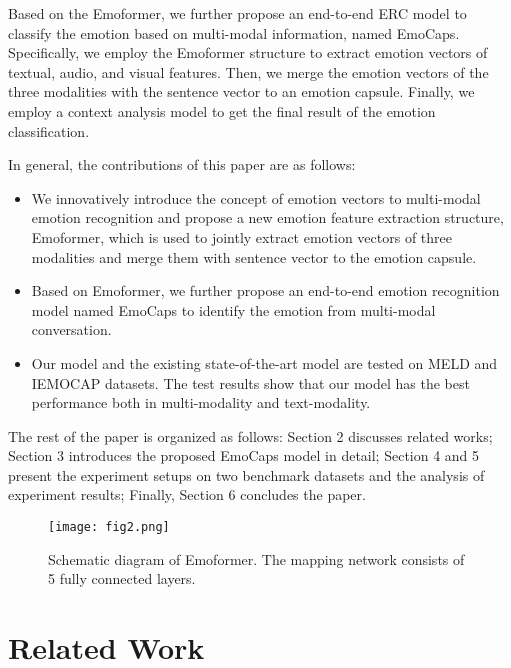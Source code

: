 Based on the Emoformer, we further propose an end-to-end ERC model to classify the emotion based on multi-modal information, named EmoCaps. Specifically, we employ the Emoformer structure to extract emotion vectors of textual, audio, and visual features. Then, we merge the emotion vectors of the three modalities with the sentence vector to an emotion capsule. Finally, we employ a context analysis model to get the final result of the emotion classification.

In general, the contributions of this paper are as follows:

\begin{itemize}
	
	\item We innovatively introduce the concept of emotion vectors to multi-modal emotion recognition and propose a new emotion feature extraction structure, Emoformer, which is used to jointly extract emotion vectors of three modalities and merge them with sentence vector to the emotion capsule. %
	\item Based on Emoformer, we further propose an end-to-end emotion recognition model named EmoCaps to identify the emotion from multi-modal conversation.  
	\item Our model and the existing state-of-the-art model are tested on MELD and IEMOCAP datasets. The test results show that our model has the best performance both in multi-modality and text-modality.
\end{itemize}

The rest of the paper is organized as follows: Section 2 discusses related works; Section 3 introduces the proposed EmoCaps model in detail; Section 4 and 5 present the experiment setups on two benchmark datasets and the analysis of experiment results; Finally, Section 6 concludes the paper.
\begin{figure}[t]
	\centering
	\texttt{[image: fig2.png]} %
	\caption{Schematic diagram of Emoformer. The mapping network consists of 5 fully connected layers.}
	\label{fig2}
\end{figure}
\section{Related Work}
